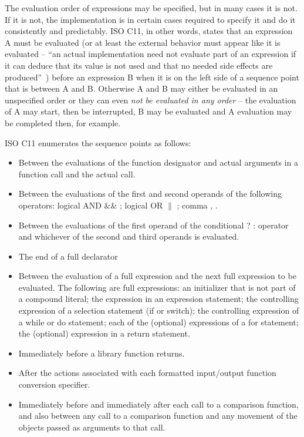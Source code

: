 The evaluation order of expressions may be specified, but in many cases it is not. If it is not, the implementation is in certain cases required to specify it and do it consistently and predictably. ISO C11, in other words, states that an expression A must be evaluated (or at least the external behavior must appear like it is evaluated -- ``an actual implementation need not evaluate part of an expression if it can deduce that its value is not used and that no needed side effects are produced''~\cite{WG14N1570}) before an expression B when it is on the left side of a sequence point that is between A and B. Otherwise A and B may either be evaluated in an unspecified order or they can even \emph{not be evaluated in any order} -- the evaluation of A may start, then be interrupted, B may be evaluated and A evaluation may be completed then, for example.

ISO C11 enumerates the sequence points as follows:~\cite{WG14N1570}
\begin{itemize}
    \item Between the evaluations of the function designator and actual arguments in a function call and the actual call.
    \item Between the evaluations of the first and second operands of the following operators: logical AND $\&\&$ ; logical OR $\|$ ; comma , .
    \item Between the evaluations of the first operand of the conditional ? : operator and whichever of the second and third operands is evaluated.
    \item The end of a full declarator
    \item Between the evaluation of a full expression and the next full expression to be evaluated. The following are full expressions: an initializer that is not part of a compound literal; the expression in an expression statement; the
controlling expression of a selection statement (if or switch); the controlling expression of a while or do statement; each of the (optional) expressions of a for statement; the (optional) expression in a return statement.
    \item Immediately before a library function returns.
    \item After the actions associated with each formatted input/output function conversion specifier.
    \item Immediately before and immediately after each call to a comparison function, and also between any call to a comparison function and any movement of the objects passed as arguments to that call.
\end{itemize}

